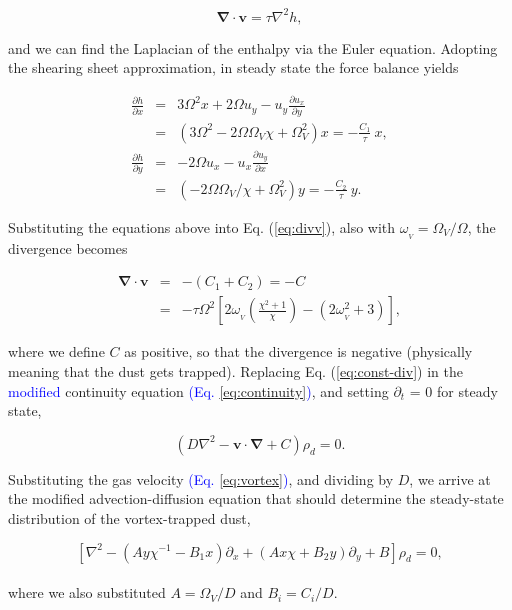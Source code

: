 \documentclass[apj]{emulateapj}
\newcommand{\pderiv}[2]{\frac{\partial #1}{\partial #2}}
\renewcommand{\v}[1]{{\boldsymbol{#1}}} %
\def\blue#1{\textcolor{blue}{#1}}
\newcommand{\del}{\v{\nabla}}
\newcommand{\Div}{\del\cdot}
\newcommand{\Laplace}{\nabla^2}
\newcommand{\Eq}[1]{Eq. (\ref{#1})}
\newcommand{\eq}[1]{\Eq{#1}}
\newcommand{\eqp}[1]{(Eq. \ref{#1})}
\newcommand{\beq}{\begin{equation}}
\newcommand{\eeq}{\end{equation}}
\newcommand{\beqn}{\begin{eqnarray}}
\newcommand{\eeqn}{\end{eqnarray}}
\begin{document}
\beq
\Div{\v{v}} = \tau \Laplace{h}, 
\label{eq:divv}
\eeq

\noindent and we can find the Laplacian of the enthalpy via the Euler
equation. Adopting the shearing sheet approximation, in steady state
the force balance yields  

\begin{eqnarray}
\pderiv{h}{x} &=& 3\varOmega^2 x + 2\varOmega u_y -
u_y\pderiv{u_x}{y} \nonumber \\
&=& \left(3\varOmega^2 - 2\varOmega\varOmega_V \chi + \varOmega_V^2\right) x
= -\frac{C_1}{\tau} \  x,  \\
\pderiv{h}{y} &=& - 2\varOmega u_x -
u_x\pderiv{u_y}{x} \nonumber \\
&=& \left(-2\varOmega\varOmega_V/\chi + \varOmega_V^2\right) y = -\frac{C_2}{\tau} \  y.
\end{eqnarray}

\noindent  Substituting the equations above into \eq{eq:divv}, also
with $\omega_{_V}=\varOmega_V/\varOmega$, the divergence becomes 

\beqn
\Div{\v{v}} &=& -(C_1+C_2) = - C \label{eq:const-div}\\
&=& - \tau\varOmega^2
\left[2\omega_{_V}\left(\frac{\chi^2+1}{\chi}\right) - (2\omega_{_V}^2
  + 3) \right], 
\label{eq:scale-div}
\eeqn

\noindent where we define $C$ as positive, so that the divergence is
negative (physically meaning that the dust gets trapped). Replacing
\eq{eq:const-div} in the \blue{modified} continuity equation \blue{\eqp{eq:continuity}}, and setting $\partial_t$ =
0 for steady state, 

\beq
\left(D\Laplace{} -  \v{v}\cdot\del  + C\right)\rho_d = 0. 
\label{eq:steady}
\eeq

Substituting the gas velocity \blue{\eqp{eq:vortex}}, and dividing by $D$, we
arrive at the modified advection-diffusion equation that should
determine the steady-state distribution of the vortex-trapped dust, 

\beq
\left[\Laplace{} - \left(Ay\chi^{-1} - B_1x\right) \partial_x  +
  \left(A x \chi + B_2y\right) \partial_y + B \right] \rho_d   = 0,  
\label{eq:dust-trapping-cartesian}
\eeq
\\
\noindent where we also substituted  $A=\varOmega_V/D$ and $B_i=C_i/D$.
\end{document}
